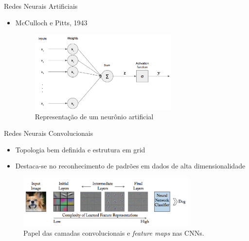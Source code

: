 

\begin{frame}{Redes Neurais Artificiais}
   \ \  \\[0.1cm]
  \begin{itemize}
  \item McCulloch e Pitts, 1943
  \begin{figure}[ht]
  	\centering
  	\label{fig:neuronio}
  	\includegraphics[width=0.7\textwidth]{img/perceptron.png}
     \caption{Representação de um neurônio artificial}
  \end{figure}
\end{itemize}
\end{frame}

\begin{frame}{Redes Neurais Convolucionais}
   \ \  \\[0.1cm]
   \begin{itemize}
     \item Topologia bem definida e estrutura em grid
    \item Destaca-se no reconhecimento de padrões em dados de alta dimensionalidade
   \end{itemize}
   \begin{figure}[!h]
   	\centering
   	\label{fig:convolutions}
   	\includegraphics[width=0.8\textwidth]{./img/fundamenta/convolutions}
     \caption{Papel das camadas convolucionais e \emph{feature maps} nas CNNs.}
   \end{figure}
\end{frame}

